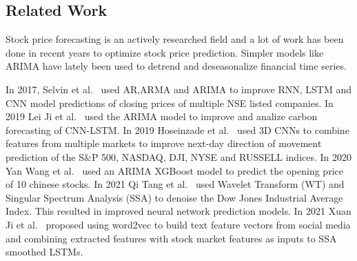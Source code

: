 \documentclass[12pt,journal,compsoc]{IEEEtran}
\begin{document}
\subsection{Related Work}
\par Stock price forecasting is an actively researched field and a lot of work has been done in recent years to optimize stock price prediction.
Simpler models like ARIMA have lately been used to detrend and deseasonalize financial time series.
\par In 2017, Selvin et al.~\cite{selvin2017stock} used AR,ARMA and ARIMA to improve RNN, LSTM and CNN model predictions of closing prices of multiple NSE listed companies.
In 2019 Lei Ji et al.~\cite{carbon} used the ARIMA model to improve and analize carbon forecasting of CNN-LSTM.
In 2019 Hoseinzade et al.~\cite{HOSEINZADE2019273} used 3D CNNs to combine features from multiple markets to improve next-day direction of movement prediction of the S\&P 500, NASDAQ, DJI, NYSE and RUSSELL indices.
In 2020 Yan Wang et al.~\cite{wang2020forecasting} used an ARIMA XGBoost model to predict the opening price of 10 chinese stocks.
In 2021 Qi Tang et al.~\cite{ssa_transform} used Wavelet Transform (WT) and Singular Spectrum Analysis (SSA) to denoise the Dow Jones Industrial Average Index. This resulted in improved neural network prediction models.
In 2021 Xuan Ji et al.~\cite{word2vec} proposed using word2vec to build text feature vectors from social media and combining extracted features with stock market features as inputs to SSA smoothed LSTMs.


%
%
\end{document}
